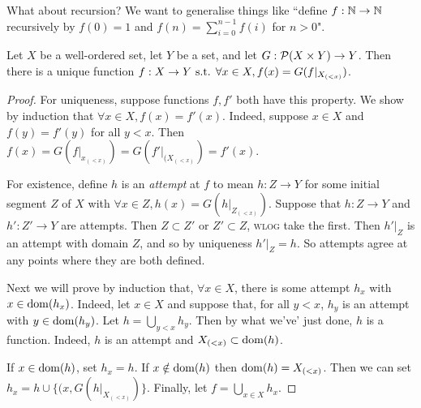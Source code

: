 \documentclass[10pt,a4paper]{article}
\begin{document}
What about recursion? We want to generalise things like ``define $f: \mathbb{N} \to \mathbb{N}$ recursively by $f(0)=1$ and $f(n) = \sum_{i=0}^{n-1}f(i)$ for $n > 0$".

\begin{proposition}
Let $X$ be a well-ordered set, let $Y$ be a set, and let $G:\mathcal{P} (X\times Y) \to Y$. Then there is a unique function $f:X \to Y \text{ s.t. } \forall x \in X, f(x) = G(f|_{X_{(<x)}})$.
\end{proposition}
\begin{proof}
For uniqueness, suppose functions $f, f'$ both have this property. We show by induction that $\forall x \in X, f(x) = f'(x)$. Indeed, suppose $x \in X$ and $f(y) = f'(y)$ for all $y < x$. Then $f(x) = G(f|_{x_{(<x)}}) = G(f'|_{(X_{(<x)}}) = f'(x)$.

For existence, define $h$ is an \emph{attempt} at $f$ to mean $h:Z \to Y$ for some initial segment $Z$ of $X$ with $\forall x \in Z, h(x) = G(h|_{Z_{(<x)}})$. Suppose that $h:Z \to Y$ and $h':Z'\to Y$ are attempts. Then $Z \subset Z'$ or $Z' \subset Z$, \textsc{wlog} take the first. Then $h'|_Z$ is an attempt with domain $Z$, and so by uniqueness $h'|_Z = h$. So attempts agree at any points where they are both defined.

Next we will prove by induction that, $\forall x \in X$, there is some attempt $h_x$ with $x \in \operatorname{dom} (h_x)$. Indeed, let $x \in X$ and suppose that, for all $y <x$, $h_y$ is an attempt with $y \in \operatorname{dom} (h_y)$. Let $h = \bigcup_{y<x} h_y$. Then by what we've' just done, $h$ is a function. Indeed, $h$ is an attempt and $X_{(<x)} \subset \operatorname{dom}(h)$. 

If $x \in \operatorname{dom}(h)$, set $h_x = h$. If $x \notin \operatorname{dom}(h)$ then $\operatorname{dom}(h) = X_{(<x)}$. Then we can set $h_x = h\cup \{(x, G(h|_{X_{(<x)}})\}$. Finally, let $f = \bigcup_{x \in X} h_x$.
\end{proof}
\end{document}
